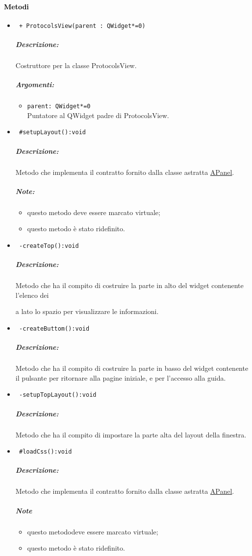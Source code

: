 \paragraph{\textcolor{black}{Metodi\\}}
\begin{itemize}
\item\color{blue}\verb! + ProtocolsView(parent : QWidget*=0)!
\color{black}
\subparagraph{Descrizione:}Costruttore per la classe ProtocolsView. 
\subparagraph{Argomenti:}
\begin{itemize}
\item \color{RoyalPurple}\verb!parent: QWidget*=0  !\\ Puntatore al QWidget padre di ProtocolsView.
\end{itemize}

\item\color{blue}\verb! #setupLayout():void!
\color{black}
\subparagraph{Descrizione:}Metodo che implementa il contratto fornito dalla classe astratta \hyperref[speAPanel]{APanel}.
\subparagraph{Note:}
\begin{itemize}
\item questo metodo deve essere marcato virtuale;
\item questo metodo è stato ridefinito.
\end{itemize}
 
\item\color{blue}\verb! -createTop():void!
\color{black}
\subparagraph{Descrizione:}Metodo che ha il compito di costruire la parte in alto del widget contenente l'elenco dei \subject e a lato lo spazio per visualizzare le informazioni.
 
\item\color{blue}\verb! -createButtom():void!
\color{black}
\subparagraph{Descrizione:}Metodo che ha il compito di costruire la parte in basso del widget contenente il pulsante per ritornare alla pagine iniziale, e per l'accesso alla guida.

\item\color{blue}\verb! -setupTopLayout():void!
\color{black}
\subparagraph{Descrizione:}Metodo che ha il compito di impostare la parte alta del layout della finestra.
  
\item\color{blue}\verb! #loadCss():void!
\color{black}
\subparagraph{Descrizione:}Metodo che implementa il contratto fornito dalla classe astratta \hyperref[speAPanel]{APanel}.
 \subparagraph{Note}
 \begin{itemize}
  \item questo metododeve essere marcato virtuale;
 \item questo metodo è stato ridefinito.
 \end{itemize}
 

\end{itemize}
